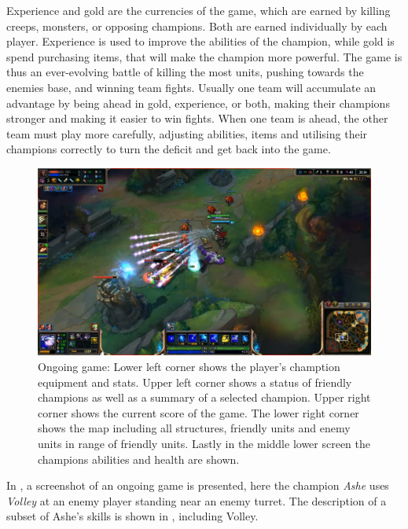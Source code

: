 Experience and gold are the currencies of the game, which are earned by killing creeps, monsters, or opposing champions. Both are earned individually by each player. Experience is used to improve the abilities of the champion, while gold is spend purchasing items, that will make the champion more powerful. The game is thus an ever-evolving battle of killing the most units, pushing towards the enemies base, and winning team fights. Usually one team will accumulate an advantage by being ahead in gold, experience, or both, making their champions stronger and making it easier to win fights. When one team is ahead, the other team must play more carefully, adjusting abilities, items and utilising their champions correctly to turn the deficit and get back into the game.

\begin{figure}[!htb]
  \centering
    \includegraphics[width=1\textwidth]{img/lolgame.png}
  \caption{Ongoing game: Lower left corner shows the player's chamption equipment and stats. Upper left corner shows a status of friendly champions as well as a summary of a selected champion. Upper right corner shows the current score of the game. The lower right corner shows the map including all structures, friendly units and enemy units in range of friendly units. Lastly in the middle lower screen the champions abilities and health are shown.}\label{fig:lolgame}
\end{figure}

In , a screenshot of an ongoing game is presented, here the champion \emph{Ashe} uses \emph{Volley} at an enemy player standing near an enemy turret. The description of a subset of Ashe's skills is shown in , including Volley.

